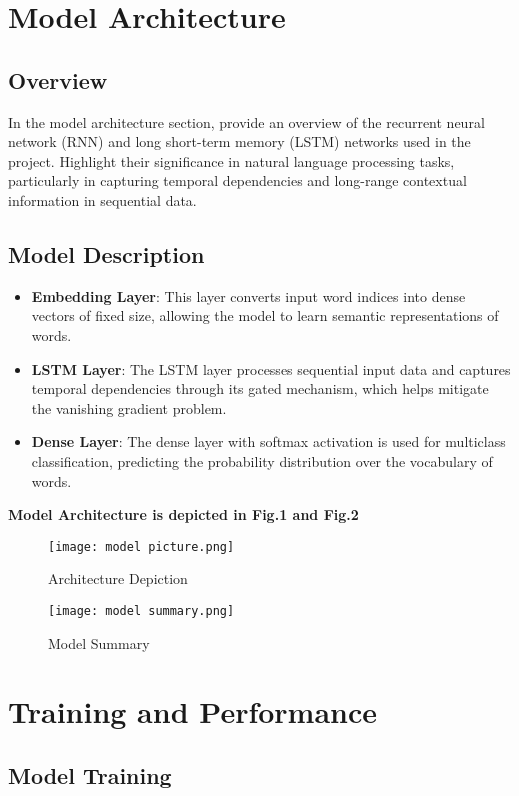 \documentclass[conference]{IEEEtran}
\begin{document}
\section{Model Architecture}
\subsection{Overview}
In the model architecture section, provide an overview of the recurrent neural network (RNN) and long short-term memory (LSTM) networks used in the project. Highlight their significance in natural language processing tasks, particularly in capturing temporal dependencies and long-range contextual information in sequential data. 
\subsection{Model Description}

\begin{itemize}
    \item \textbf{Embedding Layer}: This layer converts input word indices into dense vectors of fixed size, allowing the model to learn semantic representations of words.
    \item \textbf{LSTM Layer}: The LSTM layer processes sequential input data and captures temporal dependencies through its gated mechanism, which helps mitigate the vanishing gradient problem.
    \item \textbf{Dense Layer}: The dense layer with softmax activation is used for multiclass classification, predicting the probability distribution over the vocabulary of words.
\end{itemize}

\textbf{Model Architecture is depicted in Fig.1 and Fig.2}
 \begin{figure}
     \centering
     \texttt{[image: model picture.png]}
     \caption{Architecture Depiction}
     \label{fig:enter-label}
 \end{figure}
\begin{figure}
    \centering
    \texttt{[image: model summary.png]}
    \caption{Model Summary}
    \label{fig:enter-label}
\end{figure}
\section{Training and Performance}\label{AA}

\subsection{Model Training}
\end{document}
